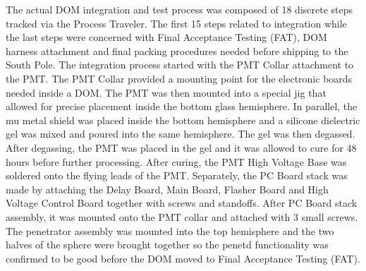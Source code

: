The actual DOM integration and test process was composed of 18 discrete
steps tracked via the Process Traveler. The first 15 steps related to
integration while the last steps were concerned with Final Acceptance
Testing (FAT), DOM harness attachment and final packing procedures needed
before shipping to the South Pole. The integration process started with the
PMT Collar attachment to the PMT. The PMT Collar provided a mounting point
for the electronic boards needed inside a DOM. The PMT was then mounted
into a special jig that allowed for precise placement inside the bottom
glass hemisphere. In parallel, the mu metal shield  was placed inside the
bottom hemisphere and a silicone dielectric gel was mixed and poured into
the same hemisphere. The gel was then degassed. After degassing, the PMT
was placed in the gel and it was allowed to cure for 48 hours before
further processing. After curing, the PMT High Voltage Base was soldered
onto the flying leads of the PMT. Separately, the PC Board stack was made
by attaching the Delay Board, Main Board, Flasher Board and High Voltage
Control Board together with screws and standoffs. After PC Board stack
assembly, it was mounted onto the PMT collar and attached with 3 small
screws. The penetrator assembly was mounted into the top hemisphere and the
two halves of the sphere were brought together so the penetd functionality
was confirmed to be good before the DOM moved to Final Acceptance Testing
(FAT).

